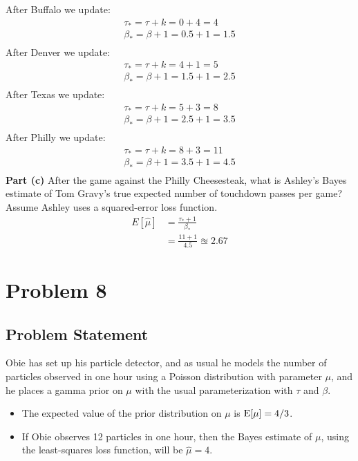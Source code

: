 \documentclass[12pt]{article}
\theoremstyle{definition}
\begin{document}
After Buffalo we update:
\begin{align*}
\tau_* = \tau + k = 0 + 4 = 4\\
\beta_* = \beta + 1 = 0.5 + 1 = 1.5\\
\end{align*}
After Denver we update:
\begin{align*}
\tau_* = \tau + k = 4 + 1 = 5\\
\beta_* = \beta + 1 = 1.5 + 1 = 2.5\\
\end{align*}
After Texas we update:
\begin{align*}
\tau_* = \tau + k = 5 + 3 = 8\\
\beta_* = \beta + 1 = 2.5 + 1 = 3.5\\
\end{align*}
After Philly we update:
\begin{align*}
\tau_* = \tau + k = 8 + 3 = 11\\
\beta_* = \beta + 1 = 3.5 + 1 = 4.5\\
\end{align*}
\noindent
{\bf Part (c)} After the game against the Philly Cheesesteak, what is Ashley's Bayes estimate of Tom Gravy's true expected number of touchdown passes per game? Assume Ashley uses a squared-error loss function.
\begin{align*}
E[\hat{\mu}] &= \frac{\tau_* + 1}{\beta_*}\\
&= \frac{11 + 1}{4.5} \approxeq 2.67
\end{align*}



\newpage
\section*{Problem 8}

\subsection*{Problem Statement}

Obie has set up his particle detector, and as usual he models the number of particles observed in one hour using a Poisson distribution with parameter $\mu$, and he places a gamma prior on $\mu$ with the usual parameterization with $\tau$ and $\beta$.
\begin{itemize}
	\item The expected value of the prior distribution on $\mu$ is $\hbox{E}[\mu] = 4/3$.
	\item If Obie observes 12 particles in one hour, then the Bayes estimate of $\mu$, using the least-squares loss function, will be $\hat{\mu} = 4$.
\end{itemize}
\end{document}
